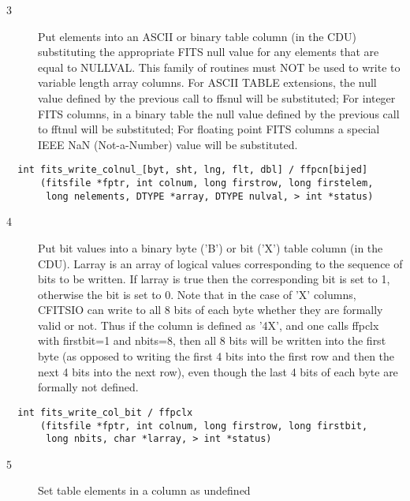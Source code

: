 \begin{description}
\item[3 ] Put elements into an ASCII or binary table column (in the CDU)
    substituting the appropriate FITS null value for any elements that
    are equal to NULLVAL.  This family of routines must NOT be used to
    write to  variable length array columns. For ASCII TABLE extensions, the
    null value defined by the previous call to ffsnul will be substituted;
    For integer FITS columns, in a binary table  the null value
    defined by the previous call to fftnul will be substituted;
    For floating point FITS columns a special IEEE NaN (Not-a-Number)
   value will be substituted.
\end{description}

\begin{verbatim}
  int fits_write_colnul_[byt, sht, lng, flt, dbl] / ffpcn[bijed]
      (fitsfile *fptr, int colnum, long firstrow, long firstelem,
       long nelements, DTYPE *array, DTYPE nulval, > int *status)
\end{verbatim}

\begin{description}
\item[4 ] Put bit values into a binary byte ('B') or bit ('X') table column (in the
    CDU).  Larray is an array of logical values corresponding to the sequence of
    bits to be written.  If larray is true then the corresponding bit is
    set to 1, otherwise the bit is set to 0.  Note that in the case of
    'X' columns, CFITSIO can write to all 8 bits of each byte whether
    they are formally valid or not.  Thus if the column is defined as
    '4X', and one calls ffpclx with  firstbit=1 and nbits=8, then all 8 bits
    will be written into the first byte (as opposed to writing the
    first 4 bits into the first row and then the next 4 bits into the
    next row), even though the last 4 bits of each byte are formally
   not defined.
\end{description}

\begin{verbatim}
  int fits_write_col_bit / ffpclx
      (fitsfile *fptr, int colnum, long firstrow, long firstbit,
       long nbits, char *larray, > int *status)
\end{verbatim}

\begin{description}
\item[5 ] Set table elements in a column as undefined
\end{description}

